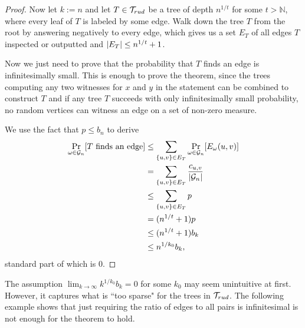 \begin{proof}
Now let $k:=n$ and let $T\in \mathcal{T}_{rud}$ be a tree of depth $n^{1/t}$ for some $t>\mathbb{N}$, where every leaf of $T$ is labeled by some edge. Walk down the tree $T$ from the root by answering negatively to every edge, which gives us a set $E_T$ of all edges $T$ inspected or outputted and $\left|{E_T}\right|\leq n^{1/t}+1$.

Now we just need to prove that the probability that $T$ finds an edge is infinitesimally small. This is enough to prove the theorem, since the trees computing any two witnesses for $x$ and $y$ in the statement can be combined to construct $T$ and if any tree $T$ succeeds with only infinitesimally small probability, no random vertices can witness an edge on a set of non-zero measure.

We use the fact that $p\leq b_n$ to derive 
\begin{align}
\Pr_{\omega\in\mathcal{G}_n}[T\text{ finds an edge}]&\leq \sum_{\{u,v\}\in E_T} \Pr_{\omega\in \mathcal{G}_n}[E_\omega(u,v)]\\
&=\sum_{\{u,v\}\in E_T} \frac{c_{u,v}}{\left|{\mathcal{G}_n}\right|}\\
&\leq\sum_{\{u,v\}\in E_T} p\\
&=(n^{1/t}+1)p\\
&\leq(n^{1/t}+1)b_k\\
&\leq n^{1/k_0}b_k,
\end{align}
standard part of which is $0$.
\end{proof}

The assumption $\lim_{k\to \infty} k^{1/k_0}b_k=0$ for some $k_0$ may seem unintuitive at first. However, it captures what is ``too sparse" for the trees in $\mathcal{T}_{rud}$. The following example shows that just requiring the ratio of edges to all pairs is infinitesimal is not enough for the theorem to hold.


